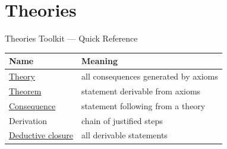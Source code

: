 \section{Theories}

\begin{toolkitbox}{Theories Toolkit --- Quick Reference}
\small
\begin{tabular}{l l}
\toprule
\textbf{Name}  & \textbf{Meaning} \\
\midrule
\hyperref[def:axiom-systems-theory]{Theory}  & all consequences generated by axioms \\
\hyperref[def:axiom-systems-theorem]{Theorem}  & statement derivable from axioms \\
\hyperref[def:axiom-systems-consequence]{Consequence}  & statement following from a theory \\
Derivation & chain of justified steps \\
\hyperref[def:deductive-closure]{Deductive closure}  & all derivable statements \\
\bottomrule
\end{tabular}
\end{toolkitbox}


